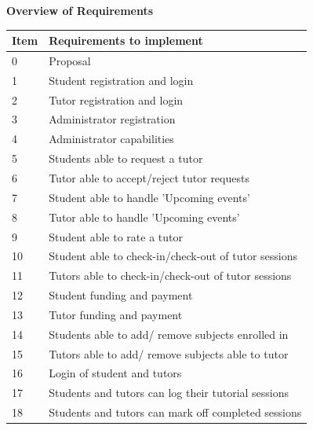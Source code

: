 \documentclass[12pt]{article}
\begin{document}
\begin{flushleft}
\textbf{Overview of Requirements}
\end{flushleft}
{
\centering
\begin{longtable}{| p{1.5cm} | p{13.5cm}|  }
\hline			
\textbf{Item} & \textbf{Requirements to implement}	
			
	\\ \hline 0 & Proposal 
		\\ \hline 1 & Student registration and login \\ \hline 
			
			2 & Tutor registration and login \\ \hline	
 
			3 & Administrator registration  \\ \hline  

			
			4 & Administrator capabilities\\ \hline 
			
			5 & Students able to request a tutor\\ \hline

				6 & Tutor able to accept/reject tutor requests\\ \hline

				7 & Student able to handle 'Upcoming events'   \\ \hline	
				
				8 & Tutor able to handle 'Upcoming events'  \\ \hline	
							
				9 & Student able to rate a tutor \\ \hline

				10 & Student able to check-in/check-out of tutor sessions  \\ \hline	

				11 & Tutors able to check-in/check-out of tutor sessions   \\ \hline	

				12 & Student funding and payment \\ \hline	
				13 & Tutor funding and payment \\ \hline	
				14 & Students able to add/ remove subjects enrolled in\\ \hline
				15 & Tutors able to add/ remove subjects able to tutor\\ \hline
				16 & Login of student and tutors\\ \hline
				17 & Students and tutors can log their tutorial sessions\\ \hline	
				18 & Students and tutors can mark off completed sessions\\ \hline					


\end{longtable}
}
\end{document}

